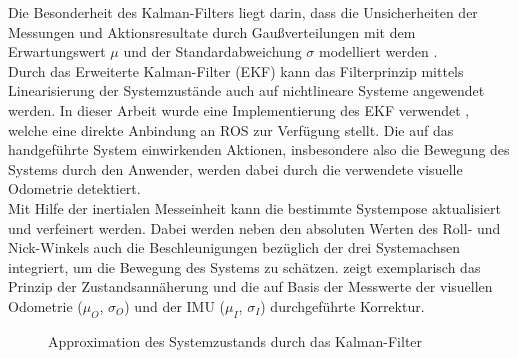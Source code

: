 Die Besonderheit des Kalman-Filters liegt darin, dass die Unsicherheiten der Messungen und Aktionsresultate durch Gaußverteilungen mit dem Erwartungswert $\mu$ und der Standardabweichung $\sigma$ modelliert werden \cite{Hertzberg2012}.\\
Durch das Erweiterte Kalman-Filter (EKF) kann das Filterprinzip mittels Linearisierung der Systemzustände auch auf nichtlineare Systeme angewendet werden. In dieser Arbeit wurde eine Implementierung des EKF verwendet \cite{EKF}, welche eine direkte Anbindung an ROS zur Verfügung stellt. Die auf das handgeführte System einwirkenden Aktionen, insbesondere also die Bewegung des Systems durch den Anwender, werden dabei durch die verwendete visuelle Odometrie detektiert.\\
Mit Hilfe der inertialen Messeinheit kann die bestimmte Systempose aktualisiert und verfeinert werden. Dabei werden neben den absoluten Werten des Roll- und Nick-Winkels auch die Beschleunigungen bezüglich der drei Systemachsen integriert, um die Bewegung des Systems zu schätzen.  zeigt
exemplarisch das Prinzip der Zustandsannäherung und die auf Basis der Messwerte der visuellen Odometrie ($\mu_O$, $\sigma_O$) und der IMU ($\mu_I$, $\sigma_I$) durchgeführte Korrektur.
%
\begin{figure}[ht]
	\begin{center}%
		\caption{Approximation des Systemzustands durch das Kalman-Filter}
		\label{fig.kalman}
	\end{center}
	\vspace*{-8mm}
\end{figure}

\prever{
\red[plot?\\]
}




